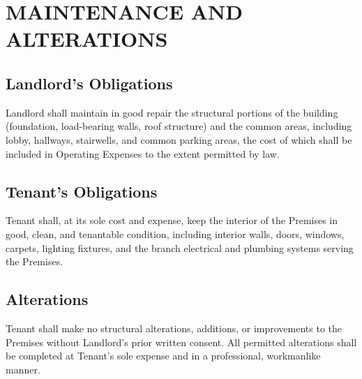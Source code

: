 \section{MAINTENANCE AND ALTERATIONS}
\subsection{Landlord's Obligations}
Landlord shall maintain in good repair the structural portions of the building (foundation, load-bearing walls, roof structure) and the common areas, including lobby, hallways, stairwells, and common parking areas, the cost of which shall be included in Operating Expenses to the extent permitted by law.

\subsection{Tenant's Obligations}
Tenant shall, at its sole cost and expense, keep the interior of the Premises in good, clean, and tenantable condition, including interior walls, doors, windows, carpets, lighting fixtures, and the branch electrical and plumbing systems serving the Premises.

\subsection{Alterations}
Tenant shall make no structural alterations, additions, or improvements to the Premises without Landlord's prior written consent. All permitted alterations shall be completed at Tenant's sole expense and in a professional, workmanlike manner.

